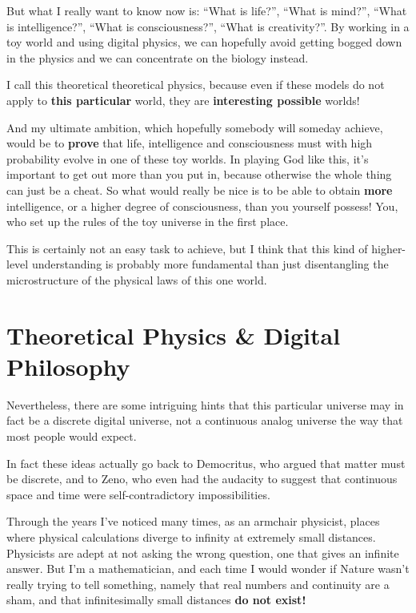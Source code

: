 \documentclass[12pt]{book}
\begin{document}
But what I really want to know now is:
``What is life?'', ``What is mind?'', ``What is intelligence?'', ``What is consciousness?'',
``What is creativity?''.
By working in a toy world and using digital physics, we can hopefully avoid
getting bogged down in the
physics and we can concentrate on the biology instead.
 
I call this theoretical theoretical physics, because even if these models do not
apply to \textbf{this particular} world, they are \textbf{interesting possible} worlds!
 
And my ultimate ambition, which hopefully somebody will someday achieve, would be
to \textbf{prove} that life, intelligence and consciousness must with high probability
evolve in one of these toy worlds.  In playing God like this, it's important to
get out more than you put in, because otherwise the whole thing can just be a cheat.  
So what would really be nice is to be able to obtain \textbf{more} intelligence, or
a higher degree of consciousness, than you yourself possess!
You, who set up the rules of the toy universe in the first place.
 
This is certainly not an easy task to achieve, but I think that this 
kind of higher-level understanding
is probably more fundamental than just disentangling the microstructure of the physical
laws of this one world.
     
\section*{Theoretical Physics \& Digital Philosophy}

Nevertheless, there are some intriguing hints that this particular universe
may in fact be a discrete digital universe, not a continuous analog universe
the way that most people would expect.
 
In fact these ideas actually go back to Democritus, who argued that matter must be
discrete, and to Zeno, who even had the audacity to suggest that continuous
space and time were self-contradictory impossibilities.
 
Through the years I've noticed many times, as an armchair physicist, places where
physical calculations diverge to infinity at extremely small distances. Physicists are adept
at not asking the wrong question, one that gives an infinite answer.  
But I'm a mathematician, and each time I would
wonder if Nature wasn't really trying to tell something, namely that real numbers and continuity are
a sham, and that infinitesimally small distances \textbf{do not exist!}
 
\end{document}
